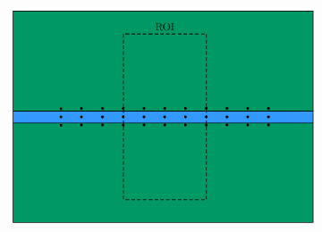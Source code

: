 \documentclass[preprint,authoryear,12pt]{elsarticle}
\begin{document}
\begin{figure}[htp]{}
\begin{center}
\begin{subfigure}{0.49\linewidth}
      \end{subfigure}\hspace{-0.9cm}
      \begin{subfigure}{0.49\linewidth}
         \label{fig:SurveyDesign_StraightTunnel_Layout_4LinearArrays_Y}
         \includegraphics[trim=0cm 0cm 0cm 0cm, clip=true,width=\linewidth]{./figures/Fig8d.pdf}
      \end{subfigure}


\end{center}
\end{figure}
\end{document}
